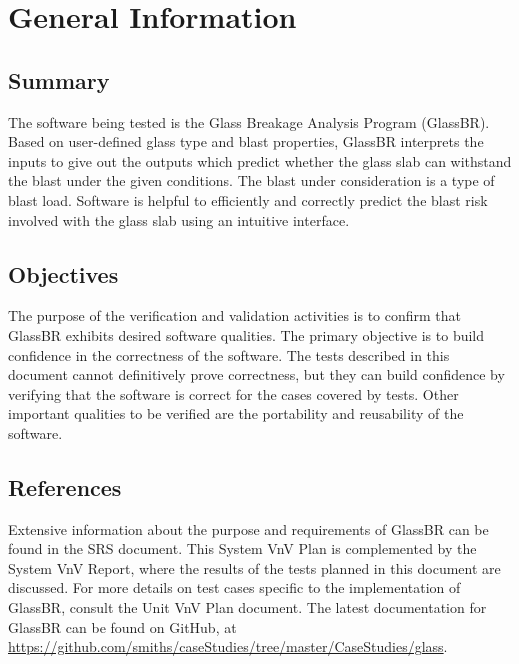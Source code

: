 \documentclass[12pt, titlepage]{article}
\newcommand{\progname}{GlassBR}
\begin{document}
\section{General Information} \label{sec_GenInfo}

\subsection{Summary}

\noindent The software being tested is the Glass Breakage Analysis Program 
(\progname{}). Based on user-defined glass type and blast properties,
\progname{} interprets the inputs to give out the outputs which
predict whether the glass slab can withstand the blast under the given conditions. The blast under
consideration is a type of  blast load. Software is helpful to efficiently and correctly
predict the blast risk involved with the glass slab using an intuitive interface.

\subsection{Objectives}

\noindent The purpose of the verification and validation activities is to 
confirm that \progname{} exhibits desired software qualities. The primary 
objective is to build confidence in the correctness of the software. The tests 
described in this document cannot definitively prove correctness, but they can 
build confidence by verifying that the software is correct for the cases 
covered by tests. Other important qualities to be verified are the 
portability and reusability of the software.

\subsection{References}

\noindent Extensive information about the purpose and requirements of 
\progname{} can be found in the SRS document. This System VnV Plan is 
complemented by the System VnV Report, where the results of the tests planned 
in this document are discussed. For more details on test cases specific to the 
implementation of \progname{}, consult the Unit VnV Plan document. The latest 
documentation for \progname{} can be found on GitHub, at \newline 
\href{https://github.com/smiths/caseStudies/tree/master/CaseStudies/glass}{https://github.com/smiths/caseStudies/tree/master/CaseStudies/glass}.
\end{document}
